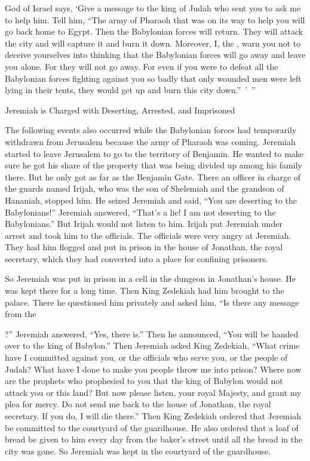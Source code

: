 {{}
God
of Israel
says,
‘Give a message to
the king
of Judah
who sent
you to
ask
me to help him. Tell him, “The army
of Pharaoh
that was on its way to help
you will go back
home
to Egypt.
Then the Babylonian
forces will return.
They will attack
the city
and will capture
it and burn
it down.
Moreover,
I, the
{}, warn you not
to deceive
yourselves
into thinking
that the Babylonian
forces will go
away and leave
you alone. For
they will not
go away.
For
even if
you were to defeat
all
the Babylonian
forces fighting
against you
so badly
that only
wounded
men
were left
lying in their tents,
they would get
up and burn
this
city
down.” ’ ”
\par }{\SH Jeremiah is Charged with Deserting, Arrested, and Imprisoned
\par }{\PP {}The following events also occurred while
the Babylonian
forces had temporarily withdrawn
from Jerusalem
because
the army
of Pharaoh was coming.
Jeremiah
started to leave
Jerusalem
to go
to the territory
of Benjamin.
He wanted to make sure he got his share of the property that was being divided
up among
his family
there.
But he
only got as far as the Benjamin
Gate.
There
an officer
in charge of the guards
named
Irijah,
who was the son
of Shelemiah
and the grandson
of Hananiah,
stopped him. He seized
Jeremiah
and said, “You
are deserting
to
the Babylonians!”
Jeremiah
answered,
“That’s a lie! I am not
deserting
to
the Babylonians.”
But Irijah would not
listen
to
him. Irijah
put
Jeremiah
under arrest and took
him to
the officials.
The officials
were very angry
at Jeremiah.
They had
him flogged
and put
in prison
in the house
of Jonathan,
the royal secretary,
which they had converted
into a place for confining prisoners.
\par }{\PP {}So
Jeremiah
was put
in
prison
in a cell
in the dungeon
in Jonathan’s house. He
was kept
there
for a long
time.
Then
King
Zedekiah
had him brought
to the palace.
There he questioned him
privately
and asked him, “Is there
any message
from the

{}?” Jeremiah
answered,
“Yes, there
is.” Then he announced, “You will be handed
over to the king
of Babylon.”
Then Jeremiah
asked
King
Zedekiah,
“What
crime
have I committed against
you, or the officials who serve
you, or the people
of Judah? What have I done to make you people throw
me into
prison?
Where
now are the prophets
who
prophesied
to you that the king
of Babylon
would not
attack
you or this
land?
But now
please
listen,
your royal
Majesty,
and grant
my plea
for mercy.
Do not
send me back
to the house
of Jonathan,
the royal secretary.
If you do,
I will die
there.”
Then
King
Zedekiah
ordered
that Jeremiah
be committed to the courtyard
of the guardhouse.
He also ordered
that a loaf
of bread
be given
to him every day
from
the baker’s
street
until
all
the bread
in the city
was gone.
So Jeremiah
was kept in the courtyard
of the guardhouse.

}
